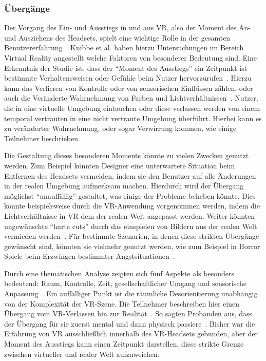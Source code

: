 \subsubsection{Übergänge}

Der Vorgang des Ein- und Ausstiegs in und aus VR, also der Moment des An- und Ausziehens des Headsets, spielt eine wichtige Rolle in der gesamten Benutzererfahrung~\cite{knibbe2018dream}.  Knibbe et al. haben hierzu Untersuchungen im Bereich Virtual Reality angestellt welche Faktoren von besonderer Bedeutung sind.
Eine Erkenntnis der Studie ist, dass der "`Moment des Ausstiegs"' ein Zeitpunkt ist bestimmte Verhaltensweisen oder Gefühle beim Nutzer hervorzurufen~\cite{knibbe2018dream}. Hierzu kann das Verlieren von Kontrolle oder von sensorischen Einflüssen zählen, oder auch die Veränderte Wahrnehmung von Farben und Lichtverhältnissen~\cite{bowman2007virtual,knibbe2018dream}. Nutzer, die in eine virtuelle Umgebung eintauchen oder diese verlassen werden von einem temporal vertrauten in eine nicht vertraute Umgebung überführt. Hierbei kann es zu veränderter Wahrnehmung, oder sogar Verwirrung kommen, wie einige Teilnehmer beschrieben. 

Die Gestaltung dieses besonderen Moments könnte zu vielen Zwecken genutzt werden. Zum Beispiel könnten Designer eine unterwartete Situation beim Entfernen des Headsets vermeiden, indem sie den Benutzer auf alle Änderungen in der realen Umgebung aufmerksam machen.
Hierdurch wird der Übergang möglichst "`unauffällig"' gestaltet, was einige der Probleme beheben könnte. 
Dies könnte beispielsweise durch die VR-Anwendung vorgenommen werden, indem die Lichtverhältnisse in VR dem der realen Welt angepasst werden.
Weiter könnten ungewünschte "`harte cuts"' durch das einspielen von Bildern aus der realen Welt vermieden werden~\cite{knibbe2018dream}.
Für bestimmte Szenarien, in denen diese strikten Übergänge gewünscht sind, könnten sie vielmehr genutzt werden, wie zum Beispiel in Horror Spiele beim Erzwingen bestimmter Angstsituationen~\cite{knibbe2018dream}.

Durch eine thematischen Analyse zeigten sich fünf Aspekte als besonders bedeutend: Raum, Kontrolle, Zeit, gesellschaftlicher Umgang und sensorische Anpassung~\cite{knibbe2018dream}.
Ein auffälliger Punkt ist die räumliche Desorientierung unabhängig von der Komplexität der VR-Szene. Die Teilnehmer beschreiben hier einen Übergang vom VR-Verlassen hin zur Realität~\cite{knibbe2018dream}. So sagten Probanden aus, dass der Übergang für sie zuerst mental und dann physisch passiere~\cite{knibbe2018dream}.
Bisher war die Erfahrung von VR ausschließlich innerhalb des VR-Headsets gebunden, aber der Moment des Ausstiegs kann einen Zeitpunkt darstellen, diese strikte Grenze zwischen virtueller und realer Welt aufzuweichen.

